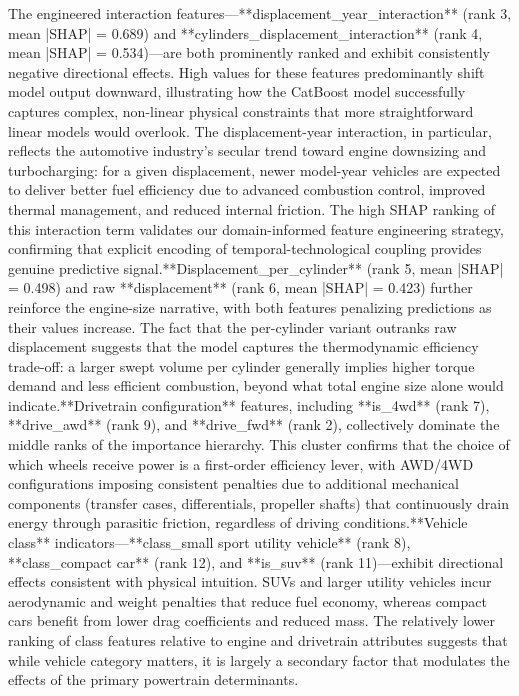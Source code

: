 The engineered interaction features—**displacement\_year\_interaction** (rank 3, mean |SHAP| = 0.689) and **cylinders\_displacement\_interaction** (rank 4, mean |SHAP| = 0.534)—are both prominently ranked and exhibit consistently negative directional effects. High values for these features predominantly shift model output downward, illustrating how the CatBoost model successfully captures complex, non-linear physical constraints that more straightforward linear models would overlook. The displacement-year interaction, in particular, reflects the automotive industry's secular trend toward engine downsizing and turbocharging: for a given displacement, newer model-year vehicles are expected to deliver better fuel efficiency due to advanced combustion control, improved thermal management, and reduced internal friction. The high SHAP ranking of this interaction term validates our domain-informed feature engineering strategy, confirming that explicit encoding of temporal-technological coupling provides genuine predictive signal.**Displacement\_per\_cylinder** (rank 5, mean |SHAP| = 0.498) and raw **displacement** (rank 6, mean |SHAP| = 0.423) further reinforce the engine-size narrative, with both features penalizing predictions as their values increase. The fact that the per-cylinder variant outranks raw displacement suggests that the model captures the thermodynamic efficiency trade-off: a larger swept volume per cylinder generally implies higher torque demand and less efficient combustion, beyond what total engine size alone would indicate.**Drivetrain configuration** features, including **is\_4wd** (rank 7), **drive\_awd** (rank 9), and **drive\_fwd** (rank 2), collectively dominate the middle ranks of the importance hierarchy. This cluster confirms that the choice of which wheels receive power is a first-order efficiency lever, with AWD/4WD configurations imposing consistent penalties due to additional mechanical components (transfer cases, differentials, propeller shafts) that continuously drain energy through parasitic friction, regardless of driving conditions.**Vehicle class** indicators—**class\_small sport utility vehicle** (rank 8), **class\_compact car** (rank 12), and **is\_suv** (rank 11)—exhibit directional effects consistent with physical intuition. SUVs and larger utility vehicles incur aerodynamic and weight penalties that reduce fuel economy, whereas compact cars benefit from lower drag coefficients and reduced mass. The relatively lower ranking of class features relative to engine and drivetrain attributes suggests that while vehicle category matters, it is largely a secondary factor that modulates the effects of the primary powertrain determinants.
